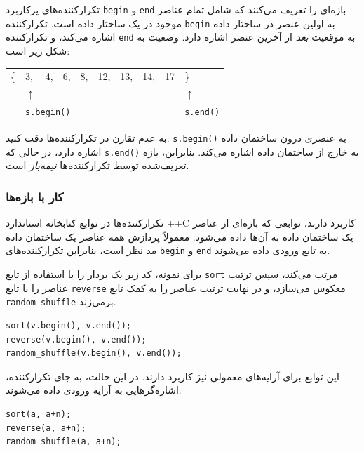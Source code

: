 تکرارکننده‌های پرکاربرد \texttt{begin}
و \texttt{end} بازه‌ای را تعریف می‌کنند که شامل
تمام عناصر موجود در یک ساختار داده است.
تکرارکننده \texttt{begin} به
اولین عنصر در ساختار داده اشاره می‌کند،
و تکرارکننده \texttt{end} به
موقعیت \emph{بعد} از آخرین عنصر اشاره دارد.
وضعیت به شکل زیر است:

\begin{center}
\begin{tabular}{llllllllll}
\{ & 3, & 4, & 6, & 8, & 12, & 13, & 14, & 17 & \} \\
& $\uparrow$ & & & & & & & & $\uparrow$ \\
& \multicolumn{3}{l}{\texttt{s.begin()}} & & & & & & \texttt{s.end()} \\
\end{tabular}
\end{center}

به عدم تقارن در تکرارکننده‌ها دقت کنید:
\texttt{s.begin()} به عنصری درون ساختمان داده اشاره دارد،
در حالی که \texttt{s.end()} به خارج از ساختمان داده اشاره می‌کند.
بنابراین، بازه تعریف‌شده توسط تکرارکننده‌ها \emph{نیمه‌باز} است.

\subsubsection{کار با بازه‌ها}

تکرارکننده‌ها در توابع کتابخانه استاندارد ++C کاربرد دارند،
توابعی که بازه‌ای از عناصر یک ساختمان داده به آن‌ها داده می‌شود.
معمولاً پردازش همه عناصر یک ساختمان داده مد نظر است،
بنابراین تکرارکننده‌های \texttt{begin} و \texttt{end} به تابع ورودی داده می‌شوند.

برای نمونه، کد زیر یک بردار را با استفاده از تابع \texttt{sort} مرتب می‌کند،
سپس ترتیب عناصر را با تابع \texttt{reverse} معکوس می‌سازد،
و در نهایت ترتیب عناصر را به کمک تابع \texttt{random\_shuffle} برمی‌زند.


\begin{lstlisting}
sort(v.begin(), v.end());
reverse(v.begin(), v.end());
random_shuffle(v.begin(), v.end());
\end{lstlisting}

این توابع برای آرایه‌های معمولی نیز کاربرد دارند.
در این حالت، به جای تکرارکننده، اشاره‌گرهایی به آرایه ورودی داده می‌شوند:

\newpage
\begin{lstlisting}
sort(a, a+n);
reverse(a, a+n);
random_shuffle(a, a+n);
\end{lstlisting}

